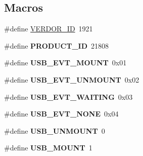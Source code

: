 \subsection*{Macros}
\begin{DoxyCompactItemize}
\item 
\#define \hyperlink{group__SYSTEM__USB__DRIVER_gaf6b170f580198c8e623aca38a5e96450}{V\+E\+R\+D\+O\+R\+\_\+\+ID}~1921
\item 
\mbox{\label{group__SYSTEM__USB__DRIVER_ga6b41096e44c646df97fba9581acb4b4a}} 
\#define {\bfseries P\+R\+O\+D\+U\+C\+T\+\_\+\+ID}~21808
\item 
\mbox{\label{group__SYSTEM__USB__DRIVER_ga65606dd2f028bd2458735b044b869dda}} 
\#define {\bfseries U\+S\+B\+\_\+\+E\+V\+T\+\_\+\+M\+O\+U\+NT}~0x01
\item 
\mbox{\label{group__SYSTEM__USB__DRIVER_gaf01af306012e270c8f16ee1a5c597dc4}} 
\#define {\bfseries U\+S\+B\+\_\+\+E\+V\+T\+\_\+\+U\+N\+M\+O\+U\+NT}~0x02
\item 
\mbox{\label{group__SYSTEM__USB__DRIVER_gaa9ecc196598c6f205b44560920e4bf6c}} 
\#define {\bfseries U\+S\+B\+\_\+\+E\+V\+T\+\_\+\+W\+A\+I\+T\+I\+NG}~0x03
\item 
\mbox{\label{group__SYSTEM__USB__DRIVER_ga77a4b4b6d8aeaf81d91f893dd2958621}} 
\#define {\bfseries U\+S\+B\+\_\+\+E\+V\+T\+\_\+\+N\+O\+NE}~0x04
\item 
\mbox{\label{group__SYSTEM__USB__DRIVER_ga748b5b8cef6b34b348684975c5d0578c}} 
\#define {\bfseries U\+S\+B\+\_\+\+U\+N\+M\+O\+U\+NT}~0
\item 
\mbox{\label{group__SYSTEM__USB__DRIVER_gac0641099c07ba1f6ad852306aadb0032}} 
\#define {\bfseries U\+S\+B\+\_\+\+M\+O\+U\+NT}~1
\end{DoxyCompactItemize}
